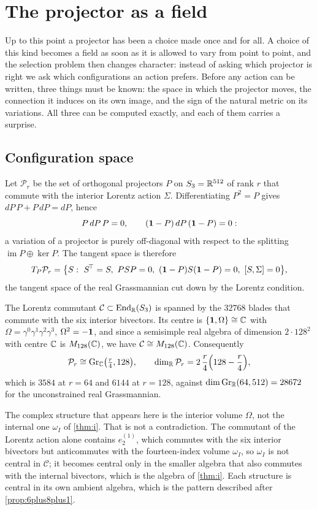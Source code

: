 \section{The projector as a field}
\label{sec:fields}

Up to this point a projector has been a choice made once and for all. A choice of this kind becomes a field as soon as it is
allowed to vary from point to point, and the selection problem then changes character: instead of asking which projector is
right we ask which configurations an action prefers. Before any action can be written, three things must be known: the space in
which the projector moves, the connection it induces on its own image, and the sign of the natural metric on its variations. All
three can be computed exactly, and each of them carries a surprise.

\subsection{Configuration space}

Let $\mathcal P_r$ be the set of orthogonal projectors $P$ on $S_3=\mathbb{R}^{512}$ of rank $r$ that commute with the interior Lorentz
action $\Sigma$. Differentiating $P^2=P$ gives $dP\,P+P\,dP=dP$, hence
\[
P\,dP\,P=0,\qquad (\mathbf 1-P)\,dP\,(\mathbf 1-P)=0 :
\]
a variation of a projector is purely off-diagonal with respect to the splitting $\operatorname{im}P\oplus\ker P$. The tangent space
is therefore
\[
T_P\mathcal P_r=\bigl\{S:\ S^{\!\top}=S,\ PSP=0,\ (\id-P)S(\id-P)=0,\ [S,\Sigma]=0\bigr\},
\]
the tangent space of the real Grassmannian cut down by the Lorentz condition.

\begin{proposition}
\label{prop:config}
The Lorentz commutant $\mathcal C\subset\operatorname{End}_{\mathbb{R}}(S_3)$ is spanned by the $32768$ blades that commute with the six interior
bivectors. Its centre is $\{\mathbf 1,\Omega\}\cong\mathbb{C}$ with $\Omega=\gamma^0\gamma^1\gamma^2\gamma^3$, $\Omega^2=-\mathbf 1$, and since a
semisimple real algebra of dimension $2\cdot128^2$ with centre $\mathbb{C}$ is $M_{128}(\mathbb{C})$, we have $\mathcal C\cong M_{128}(\mathbb{C})$.
Consequently
\[
\mathcal P_r\cong\mathrm{Gr}_{\mathbb{C}}\bigl(\tfrac r4,128\bigr),\qquad
\dim_{\mathbb{R}}\mathcal P_r=2\,\frac r4\Bigl(128-\frac r4\Bigr),
\]
which is $3584$ at $r=64$ and $6144$ at $r=128$, against $\dim\mathrm{Gr}_{\mathbb{R}}(64,512)=28672$ for the unconstrained real Grassmannian.
\end{proposition}

The complex structure that appears here is the interior volume $\Omega$, not the internal one $\omega_I$ of \cref{thm:i}. That is
not a contradiction. The commutant of the Lorentz action alone contains $e^{(1)}_2$, which commutes with the six interior bivectors
but anticommutes with the fourteen-index volume $\omega_I$, so $\omega_I$ is not central in $\mathcal C$; it becomes central only in
the smaller algebra that also commutes with the internal bivectors, which is the algebra of \cref{thm:i}. Each structure is central
in its own ambient algebra, which is the pattern described after \cref{prop:6plus8plus1}.

